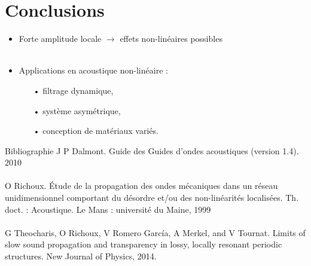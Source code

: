 \documentclass[12pt,xcolor=x11names,compress, notes=show]{beamer}%
\begin{document}
\section*{Conclusions}
\begin{frame}{\insertsectionhead}

\begin{itemize}
	\item Forte amplitude locale $\rightarrow$ effets non-linéaires possibles\\~\\
	\item Applications en acoustique non-linéaire : 
		\begin{itemize}
			\item[•] filtrage dynamique,
			\item[•] système asymétrique, 
			\item[•] conception de matériaux variés.
		\end{itemize}
\end{itemize}

	
\end{frame}

\begin{frame}{Bibliographie}
\indent J P Dalmont. Guide des Guides d'ondes acoustiques (version 1.4). 2010 \\ ~\\
\indent O Richoux. Étude de la propagation des ondes mécaniques dans un réseau unidimensionnel comportant du désordre et/ou des non-linéarités localisées. Th. doct. : Acoustique. Le Mans : université du Maine, 1999 \\~\\
\indent G Theocharis, O Richoux, V Romero García, A Merkel, and V Tournat. Limits of slow sound propagation and transparency in lossy, locally resonant periodic structures. New Journal of Physics, 2014.


\end{frame}
\end{document}
